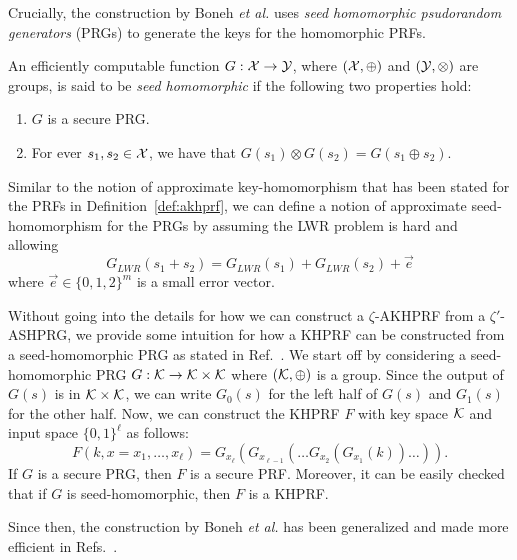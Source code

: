 Crucially, the construction by Boneh \emph{et al.} uses \emph{seed homomorphic psudorandom generators} (PRGs) to generate the keys for the homomorphic PRFs.

\begin{definition}
	An efficiently computable function $G: \mathcal{X} \to \mathcal{Y}$, where $(\mathcal{X}, \oplus)$ and $(\mathcal{Y}, \otimes)$ are groups, is said to be \emph{seed homomorphic} if the following two properties hold:
	\begin{enumerate}
		\item $G$ is a secure PRG.
		\item For ever $s_1, s_2 \in \mathcal{X}$, we have that $G\left(s_1\right) \otimes G\left(s_2\right) = G\left(s_1 \oplus s_2\right)$.
	\end{enumerate}
\end{definition}

Similar to the notion of approximate key-homomorphism that has been stated for the PRFs in Definition~\ref{def:akhprf}, we can define a notion of approximate seed-homomorphism for the PRGs by assuming the LWR problem is hard and allowing
\[G_{LWR}\left(s_1 + s_2\right) = G_{LWR}\left(s_1\right) + G_{LWR}\left(s_2\right) + \vec{e}\]
where $\vec{e} \in \{0, 1, 2\}^m$ is a small error vector.

Without going into the details for how we can construct a $\zeta$-AKHPRF from a $\zeta'$-ASHPRG, we provide some intuition for how a KHPRF can be constructed from a seed-homomorphic PRG as stated in Ref.~\cite{boneh2013key}.
We start off by considering a seed-homomorphic PRG $G: \mathcal{K} \to \mathcal{K} \times \mathcal{K}$ where $(\mathcal{K}, \oplus)$ is a group.
Since the output of $G(s)$ is in $\mathcal{K} \times \mathcal{K}$, we can write $G_0(s)$ for the left half of $G(s)$ and $G_1(s)$ for the other half. 
Now, we can construct the KHPRF $F$ with key space $\mathcal{K}$ and input space $\{0, 1\}^\ell$ as follows:
\[F(k, x=x_1, \ldots, x_\ell) = G_{x_\ell}\left(G_{x_{\ell - 1}}\left(\ldots G_{x_2}\left(G_{x_1}(k)\right)\ldots \right)\right).\]
If $G$ is a secure PRG, then $F$ is a secure PRF.
Moreover, it can be easily checked that if $G$ is seed-homomorphic, then $F$ is a KHPRF.

Since then, the construction by Boneh \emph{et al.} has been generalized and made more efficient in Refs.~\cite{newKeyHom, kim2020key}.

